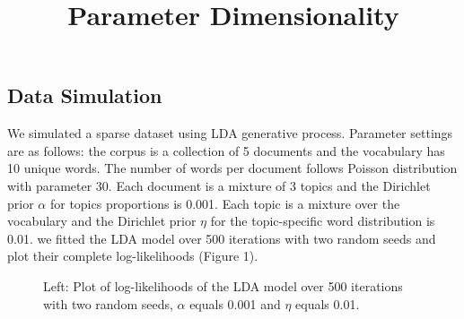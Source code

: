 \documentclass[11pt]{article}
\date{\vspace{-5ex}}
\begin{document}
\begin{spacing}{1.6}
\title{Parameter Dimensionality}
\maketitle

\section{Data Simulation}
\noindent We simulated a sparse dataset using LDA generative process. Parameter settings are as follows: the corpus is a collection of 5 documents and the vocabulary has 10 unique words. The number of words per document follows Poisson distribution with parameter 30. Each document is a mixture of 3 topics and the Dirichlet prior $\alpha$ for topics proportions is 0.001. Each topic is a mixture over the vocabulary and the Dirichlet prior $\eta$ for the topic-specific word distribution is 0.01. we fitted the LDA model over 500 iterations with two random seeds and plot their complete log-likelihoods (Figure 1).\\

\begin{figure}[h]
\begin{minipage}{0.5\textwidth} 
\end{minipage}
\caption[Caption in ToC]{Left: Plot of log-likelihoods of the LDA model over 500 iterations with two random seeds, $\alpha$ equals 0.001 and $\eta$ equals 0.01. }
\end{figure}

\end{spacing}
\end{document}
